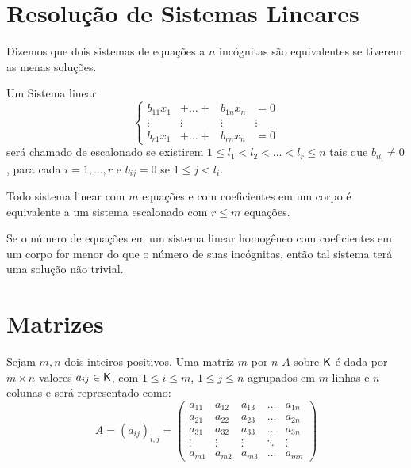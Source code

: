 \documentclass[10pt,a4paper]{book}
\begin{document}
\section{Resolução de Sistemas Lineares}

\begin{definition}
	Dizemos que dois sistemas de equações a $n$ incógnitas são equivalentes se tiverem as menas soluções.
\end{definition}

\begin{definition}
	Um Sistema linear
	\[
		\left\{
		\begin{array}{cccc}
			b_{11}x_1 & + \dots + & b_{1n}x_n & = 0   \\
			\vdots    & \vdots    & \vdots    & \vdots\\
			b_{r1}x_1 & + \dots + & b_{rn}x_n & = 0   
		\end{array}
		\right.
	\]
	será chamado de escalonado se existirem $1 \leq l_1 < l_2 < \dots < l_r \leq n$ tais que $b_{il_i} \neq 0$, para cada $i = 1, \dots, r$ e $b_{ij} = 0$ se $1 \leq j < l_i$.
\end{definition}

\begin{proposition}
	Todo sistema linear com $m$ equações e com coeficientes em um corpo é equivalente a um sistema escalonado com $r \leq m$ equações.
\end{proposition}

\begin{proposition}
	Se o número de equações em um sistema linear homogêneo com coeficientes em um corpo for menor do que o número de suas incógnitas, então tal sistema terá uma solução não trivial.
\end{proposition}




\section{Matrizes}
\begin{definition}
	Sejam $m, n$ dois inteiros positivos. Uma matriz $m$ por $n$ $A$ sobre $\mathsf{ K }$ é dada por $m \times n$ valores $a_{ij} \in \mathsf{ K }$, com $1 \leq i \leq m$, $1 \leq j \leq n$ agrupados em $m$ linhas e $n$ colunas e será representado como:
	\[
		A = (a_{ij})_{i, j} = 
		\left(
		\begin{array}{ccccc}
			a_{11} & a_{12} & a_{13} &  \dots & a_{1n} \\
			a_{21} & a_{22} & a_{23} &  \dots & a_{2n} \\
			a_{31} & a_{32} & a_{33} &  \dots & a_{3n} \\
			\vdots & \vdots & \vdots & \ddots & \vdots \\
			a_{m1} & a_{m2} & a_{m3} &  \dots & a_{mn} 
		\end{array}
		\right)
	\]
\end{definition}
\end{document}
